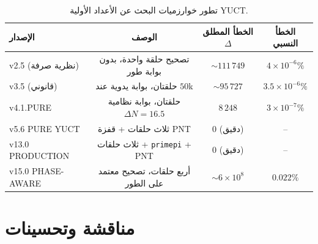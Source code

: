 \documentclass[11pt,a4paper]{article}
\begin{document}
	\begin{table}[htbp]
		\centering
		\caption{تطور خوارزميات البحث عن الأعداد الأولية YUCT.}
		\label{tab:all-versions}
		\begin{tabular}{l c c c}
			\toprule
			الإصدار & الوصف & الخطأ المطلق \(\Delta\) & الخطأ النسبي \\
			\midrule
			v2.5 (نظرية صرفة)  & تصحيح حلقة واحدة، بدون بوابة طور & \(\sim 111\,749\) & \(4\times10^{-6}\%\) \\
			v3.5 (قانوني)    & حلقتان، بوابة يدوية عند \(50\)k & \(\sim 95\,727\) & \(3.5\times10^{-6}\%\) \\
			v4.1.PURE       & حلقتان، بوابة نظامية \(\Delta N=16.5\) & \(8\,248\) & \(3\times10^{-7}\%\) \\
			v5.6 PURE YUCT  & ثلاث حلقات + قفزة PNT & 0 (دقيق) & -- \\
			v13.0 PRODUCTION & ثلاث حلقات + \texttt{primepi} + PNT & 0 (دقيق) & -- \\
			v15.0 PHASE-AWARE & أربع حلقات، تصحيح معتمد على الطور & \(\sim 6\times10^{8}\) & \(0.022\%\) \\
			\bottomrule
		\end{tabular}
	\end{table}
	
	\section{مناقشة وتحسينات}
	\label{sec:discussion}
	
\end{document}
